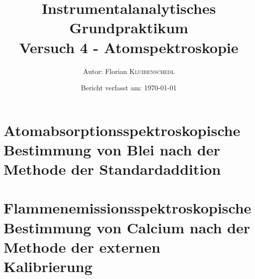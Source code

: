 \documentclass{article}
\title{Instrumentalanalytisches Grundpraktikum \\ Versuch 4 - Atomspektroskopie \cite{Versuchsvorschrift}} %
\author{Autor: Florian \textsc{Kluibenschedl}} %
\date{Bericht verfasst am: \today} %
\begin{document}
  
  \pagebreak

  \tableofcontents
  \pagebreak  
  
  
  \pagebreak
  
  
  \pagebreak
  
  \section{Atomabsorptionsspektroskopische Bestimmung von Blei nach der Methode der Standardaddition}
  
    
    \pagebreak
  
    
  
    
    \pagebreak
  
  \section{Flammenemissionsspektroskopische Bestimmung von Calcium nach der Methode der externen Kalibrierung}
  
    
    \pagebreak
  
    
  
    
    \pagebreak
  
  
  \printbibliography[title=Literaturverzeichnis]
  
  
  \listoffigures
  
  \listoftables
    
\end{document}
